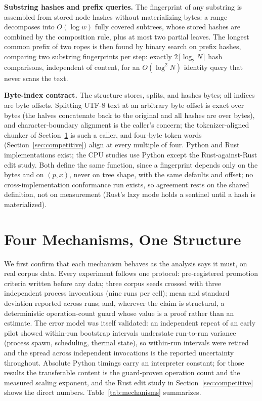 \documentclass[10pt,conference]{IEEEtran}
\begin{document}
\textbf{Substring hashes and prefix queries.} The fingerprint of any
substring is assembled from stored node hashes without materializing
bytes: a range decomposes into $O(\log w)$ fully covered subtrees,
whose stored hashes are combined by the composition rule, plus at most
two partial leaves. The longest common prefix of two ropes is then
found by binary search on prefix hashes, comparing two substring
fingerprints per step: exactly $2\lceil\log_2 N\rceil$ hash comparisons,
independent of content, for an $O(\log^2 N)$ identity query that never
scans the text.

\textbf{Byte-index contract.} The structure stores, splits, and hashes
bytes; all indices are byte offsets. Splitting UTF-8 text at an
arbitrary byte offset is exact over bytes (the halves concatenate back
to the original and all hashes are over bytes), and character-boundary
alignment is the caller's concern; the tokenizer-aligned chunker of
Section~\ref{sec:mechanisms} is such a caller, and four-byte token words
(Section~\ref{sec:competitive}) align at every multiple of four. Python
and Rust implementations exist; the CPU studies use Python except the
Rust-against-Rust edit study. Both define the same function, since a
fingerprint depends only on the bytes and on $(p, x)$, never on tree
shape, with the same defaults and offset; no cross-implementation
conformance run exists, so agreement rests on the shared definition,
not on measurement (Rust's lazy mode holds a sentinel until a hash is
materialized).

\section{Four Mechanisms, One Structure}\label{sec:mechanisms}

We first confirm that each mechanism behaves as the analysis says it
must, on real corpus data. Every experiment follows one protocol:
pre-registered promotion criteria written before any data; three corpus
seeds crossed with three independent process invocations (nine runs per
cell); mean and standard deviation reported across runs; and, wherever
the claim is structural, a deterministic operation-count guard whose
value is a proof rather than an estimate. The error model was itself
validated: an independent repeat of an early pilot showed within-run
bootstrap intervals understate run-to-run variance (process spawn,
scheduling, thermal state), so within-run intervals were retired and
the spread across independent invocations is the reported uncertainty
throughout. Absolute Python timings carry
an interpreter constant; for those results the transferable content is
the guard-proven operation count and the measured scaling exponent, and
the Rust edit study in Section~\ref{sec:competitive} shows the direct
numbers. Table~\ref{tab:mechanisms} summarizes.
\end{document}

